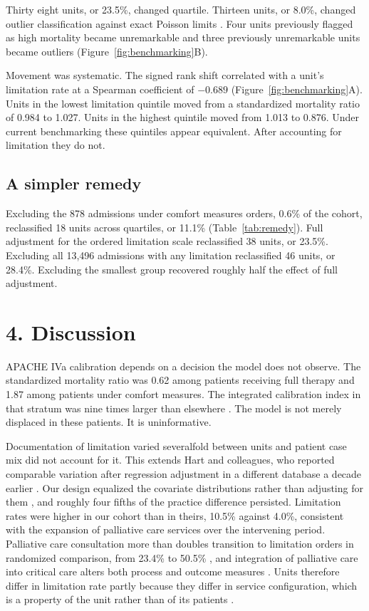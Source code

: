 \documentclass[12pt,a4paper]{article}
\begin{document}
Thirty eight units, or 23.5\%, changed quartile. Thirteen units, or 8.0\%,
changed outlier classification against exact Poisson limits \cite{ref40}. Four
units previously flagged as high mortality became unremarkable and three
previously unremarkable units became outliers
(Figure~\ref{fig:benchmarking}B).

Movement was systematic. The signed rank shift correlated with a unit's
limitation rate at a Spearman coefficient of $-0.689$
(Figure~\ref{fig:benchmarking}A). Units in the lowest limitation quintile moved
from a standardized mortality ratio of 0.984 to 1.027. Units in the highest
quintile moved from 1.013 to 0.876. Under current benchmarking these quintiles
appear equivalent. After accounting for limitation they do not.

\subsection*{A simpler remedy}
Excluding the 878 admissions under comfort measures orders, 0.6\% of the cohort,
reclassified 18 units across quartiles, or 11.1\% (Table~\ref{tab:remedy}). Full
adjustment for the ordered limitation scale reclassified 38 units, or 23.5\%.
Excluding all 13{,}496 admissions with any limitation reclassified 46 units, or
28.4\%. Excluding the smallest group recovered roughly half the effect of full
adjustment.

\section*{4. Discussion}

APACHE IVa calibration depends on a decision the model does not observe. The
standardized mortality ratio was 0.62 among patients receiving full therapy and
1.87 among patients under comfort measures. The integrated calibration index in
that stratum was nine times larger than elsewhere \cite{ref34}. The model is not
merely displaced in these patients. It is uninformative.

Documentation of limitation varied severalfold between units and patient case mix
did not account for it. This extends Hart and colleagues, who reported comparable
variation after regression adjustment in a different database a decade earlier
\cite{ref7}. Our design equalized the covariate distributions rather than
adjusting for them \cite{ref37}, and roughly four fifths of the practice
difference persisted. Limitation rates were higher in our cohort than in theirs,
10.5\% against 4.0\%, consistent with the expansion of palliative care services
over the intervening period. Palliative care consultation more than doubles
transition to limitation orders in randomized comparison, from 23.4\% to 50.5\%
\cite{ref41}, and integration of palliative care into critical care alters both
process and outcome measures \cite{ref42,ref43}. Units therefore differ in
limitation rate partly because they differ in service configuration, which is a
property of the unit rather than of its patients \cite{ref5}.
\end{document}
